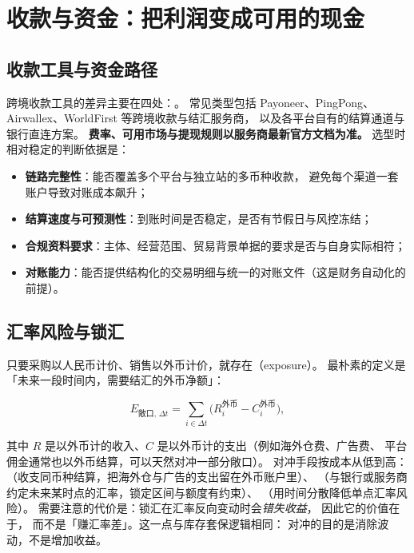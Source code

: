 \section{收款与资金：把利润变成可用的现金}
\label{sec:cbec-money}

\subsection{收款工具与资金路径}

跨境收款工具的差异主要在四处：。
常见类型包括 Payoneer、PingPong、Airwallex、WorldFirst 等跨境收款与结汇服务商，
以及各平台自有的结算通道与银行直连方案。
\textbf{费率、可用市场与提现规则以服务商最新官方文档为准。}
选型时相对稳定的判断依据是：

\begin{itemize}
  \item \textbf{链路完整性}：能否覆盖多个平台与独立站的多币种收款，
        避免每个渠道一套账户导致对账成本飙升；
  \item \textbf{结算速度与可预测性}：到账时间是否稳定，是否有节假日与风控冻结；
  \item \textbf{合规资料要求}：主体、经营范围、贸易背景单据的要求是否与自身实际相符；
  \item \textbf{对账能力}：能否提供结构化的交易明细与统一的对账文件（这是财务自动化的前提）。
\end{itemize}

\subsection{汇率风险与锁汇}

只要采购以人民币计价、销售以外币计价，就存在（exposure）。
最朴素的定义是「未来一段时间内，需要结汇的外币净额」：

\begin{equation}
E_{\text{敞口},\,\Delta t} = \sum_{i \in \Delta t} \bigl(R_{i}^{\text{外币}} - C_{i}^{\text{外币}}\bigr) ,
\label{eq:cbec-fx}
\end{equation}

其中 $R$ 是以外币计的收入、$C$ 是以外币计的支出（例如海外仓费、广告费、
平台佣金通常也以外币结算，可以天然对冲一部分敞口）。
对冲手段按成本从低到高：
（收支同币种结算，把海外仓与广告的支出留在外币账户里）、
（与银行或服务商约定未来某时点的汇率，锁定区间与额度有约束）、
（用时间分散降低单点汇率风险）。
需要注意的代价是：锁汇在汇率反向变动时会\emph{错失收益}，
因此它的价值在于，
而不是「赚汇率差」。这一点与库存套保逻辑相同：
对冲的目的是消除波动，不是增加收益。

